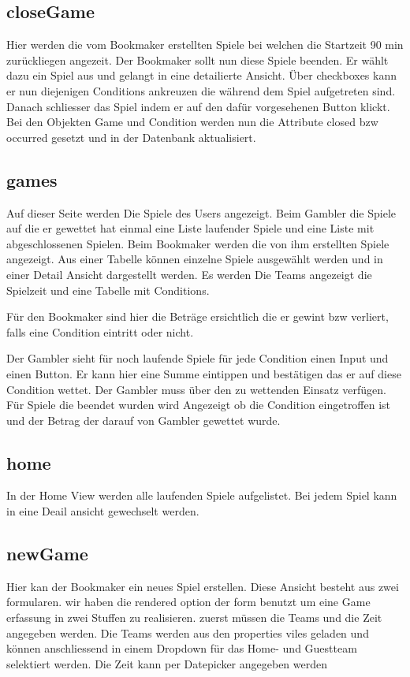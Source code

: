 \documentclass[a4paper, abstracton]{scrartcl}
\begin{document}
\subsection{closeGame}
  Hier werden die vom Bookmaker erstellten Spiele bei welchen die Startzeit
  90 min zurückliegen angezeit. Der Bookmaker sollt nun diese Spiele beenden.
  Er wählt dazu ein Spiel aus und gelangt in eine detailierte Ansicht.
  Über checkboxes kann er nun diejenigen Conditions ankreuzen die während dem
  Spiel aufgetreten sind. Danach schliesser das Spiel indem er auf den dafür
  vorgesehenen Button klickt.
  Bei den Objekten Game und Condition werden nun die Attribute closed bzw occurred
  gesetzt und in der Datenbank aktualisiert.

\subsection{games}
  Auf dieser Seite werden Die Spiele des Users angezeigt.
  Beim Gambler die Spiele auf die er gewettet hat einmal eine Liste laufender Spiele
  und eine Liste mit abgeschlossenen Spielen.
  Beim Bookmaker werden die von ihm erstellten Spiele angezeigt.
  Aus einer Tabelle können einzelne Spiele ausgewählt werden und in einer Detail
  Ansicht dargestellt werden. Es werden Die Teams angezeigt die Spielzeit und
  eine Tabelle mit Conditions.
  
  Für den Bookmaker sind hier die Beträge ersichtlich die er gewint bzw verliert,
  falls eine Condition eintritt oder nicht.
  
  Der Gambler sieht für noch laufende Spiele für jede Condition einen Input und
  einen Button. Er kann hier eine Summe eintippen und bestätigen das er auf diese
  Condition wettet. Der Gambler muss über den zu wettenden Einsatz verfügen.
  Für Spiele die beendet wurden wird Angezeigt ob die Condition eingetroffen ist
  und der Betrag der darauf von Gambler gewettet wurde.

\subsection{home}
  In der Home View werden alle laufenden Spiele aufgelistet.
  Bei jedem Spiel kann in eine Deail ansicht gewechselt werden.

\subsection{newGame}
  Hier kan der Bookmaker ein neues Spiel erstellen.
  Diese Ansicht besteht aus zwei formularen. wir haben die rendered option der form
  benutzt um eine Game erfassung in zwei Stuffen zu realisieren.
  zuerst müssen die Teams und die Zeit angegeben werden. Die Teams werden aus den
  properties viles geladen und können anschliessend in einem Dropdown für das Home-
  und Guestteam selektiert werden. Die Zeit kann per Datepicker angegeben werden 
\end{document}

